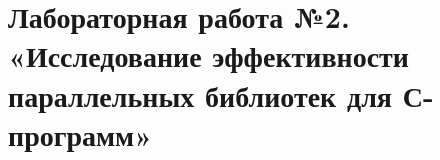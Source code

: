 { %
	\section{Лабораторная работа №2. «Исследование эффективности параллельных библиотек для С-программ»}
	
	
	
}
